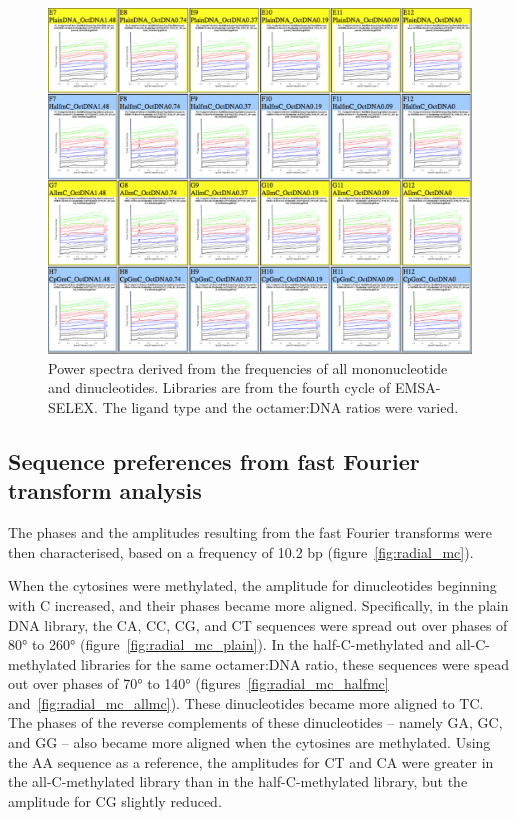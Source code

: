 \documentclass[parskip=full, numbers=noenddot]{scrreprt}
\begin{document}
\begin{figure}[htpb]
  \centering
  \includegraphics[width=\textwidth]{emsacycle4all}
  \caption{Power spectra derived from the frequencies of all mononucleotide and dinucleotides.  Libraries are from the fourth cycle of EMSA-SELEX.  The ligand type and the octamer:DNA ratios were varied.}
  \label{fig:powerspectra}
\end{figure}

\subsection{Sequence preferences from fast Fourier transform analysis}
\label{ssec:nuseqpref_fft}

The phases and the amplitudes resulting from the fast Fourier transforms were then characterised, based on a frequency of 10.2 bp (figure~\ref{fig:radial_mc}).

When the cytosines were methylated, the amplitude for dinucleotides beginning with C increased, and their phases became more aligned.  Specifically, in the plain DNA library, the CA, CC, CG, and CT sequences were spread out over phases of \ang{80} to \ang{260} (figure~\ref{fig:radial_mc_plain}).  In the half-C-methylated and all-C-methylated libraries for the same octamer:DNA ratio, these sequences were spead out over phases of \ang{70} to \ang{140} (figures~\ref{fig:radial_mc_halfmc} and~\ref{fig:radial_mc_allmc}).  These dinucleotides became more aligned to TC.  The phases of the reverse complements of these dinucleotides -- namely GA, GC, and GG -- also became more aligned when the cytosines are methylated.   Using the AA sequence as a reference, the amplitudes for CT and CA were greater in the all-C-methylated library than in the half-C-methylated library, but the amplitude for CG slightly reduced.
\end{document}
